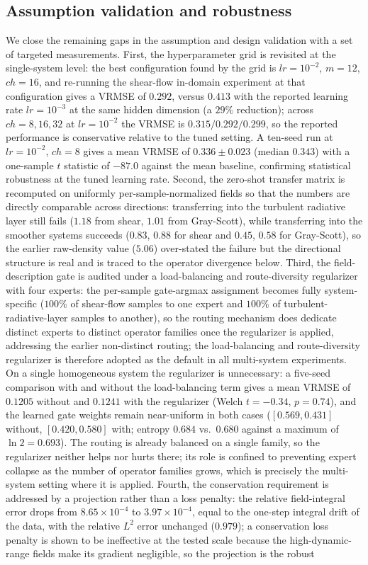 \documentclass[preprint,12pt]{elsarticle}
\begin{document}
\subsection{Assumption validation and robustness}
We close the remaining gaps in the assumption and design validation with a set of targeted measurements. First, the hyperparameter grid is revisited at the single-system level: the best configuration found by the grid is $lr=10^{-2}$, $m=12$, $ch=16$, and re-running the shear-flow in-domain experiment at that configuration gives a VRMSE of $0.292$, versus $0.413$ with the reported learning rate $lr=10^{-3}$ at the same hidden dimension (a $29\%$ reduction); across $ch=8,16,32$ at $lr=10^{-2}$ the VRMSE is $0.315/0.292/0.299$, so the reported performance is conservative relative to the tuned setting. A ten-seed run at $lr=10^{-2}$, $ch=8$ gives a mean VRMSE of $0.336\pm0.023$ (median $0.343$) with a one-sample $t$ statistic of $-87.0$ against the mean baseline, confirming statistical robustness at the tuned learning rate. Second, the zero-shot transfer matrix is recomputed on uniformly per-sample-normalized fields so that the numbers are directly comparable across directions: transferring into the turbulent radiative layer still fails ($1.18$ from shear, $1.01$ from Gray-Scott), while transferring into the smoother systems succeeds ($0.83$, $0.88$ for shear and $0.45$, $0.58$ for Gray-Scott), so the earlier raw-density value ($5.06$) over-stated the failure but the directional structure is real and is traced to the operator divergence below. Third, the field-description gate is audited under a load-balancing and route-diversity regularizer with four experts: the per-sample gate-argmax assignment becomes fully system-specific ($100\%$ of shear-flow samples to one expert and $100\%$ of turbulent-radiative-layer samples to another), so the routing mechanism does dedicate distinct experts to distinct operator families once the regularizer is applied, addressing the earlier non-distinct routing; the load-balancing and route-diversity regularizer is therefore adopted as the default in all multi-system experiments. On a single homogeneous system the regularizer is unnecessary: a five-seed comparison with and without the load-balancing term gives a mean VRMSE of $0.1205$ without and $0.1241$ with the regularizer (Welch $t=-0.34$, $p=0.74$), and the learned gate weights remain near-uniform in both cases ($[0.569,0.431]$ without, $[0.420,0.580]$ with; entropy $0.684$ vs.\ $0.680$ against a maximum of $\ln 2=0.693$). The routing is already balanced on a single family, so the regularizer neither helps nor hurts there; its role is confined to preventing expert collapse as the number of operator families grows, which is precisely the multi-system setting where it is applied. Fourth, the conservation requirement is addressed by a projection rather than a loss penalty: the relative field-integral error drops from $8.65\times10^{-4}$ to $3.97\times10^{-4}$, equal to the one-step integral drift of the data, with the relative $L^2$ error unchanged ($0.979$); a conservation loss penalty is shown to be ineffective at the tested scale because the high-dynamic-range fields make its gradient negligible, so the projection is the robust 
\end{document}
